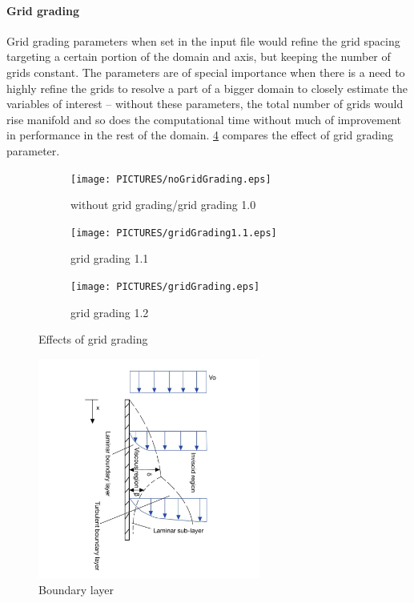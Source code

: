 \paragraph*{Grid grading}\mbox{} Grid grading parameters when set in the input file would refine the grid spacing targeting a certain portion of the domain and axis, but keeping the number of grids constant. The parameters are of special importance when there is a need to highly refine the grids to resolve a part of a bigger domain to closely estimate the variables of interest -- without these parameters, the total number of grids would rise manifold and so does the computational time without much of improvement in performance in the rest of the domain. \cref{fig:gridGrading} compares the effect of grid grading parameter. \\
\begin{figure}[!h]
        \centering
    \begin{subfigure}{.3\linewidth}
        \centering
        \texttt{[image: PICTURES/noGridGrading.eps]}
        \caption{without grid grading/grid grading 1.0}
        \label{fig:nogg}       %
    \end{subfigure}%
        \hfill
    \begin{subfigure}{.3\linewidth}
        \centering
        \texttt{[image: PICTURES/gridGrading1.1.eps]}
        \caption{grid grading 1.1}
        \label{fig:gg1.1}       %
    \end{subfigure}%
    \hfill
    \begin{subfigure}{.3\linewidth}
        \centering
        \texttt{[image: PICTURES/gridGrading.eps]}
        \caption{grid grading 1.2}
        \label{fig:gg1.2}       %
    \end{subfigure}%
        \hfill
     \caption{Effects of grid grading}
     \label{fig:gridGrading}
\end{figure}

\begin{figure}
    \centering
    \includegraphics[width=0.65\textwidth]{PICTURES/BL.jpg}
    \caption{Boundary layer}
    \label{fig:BL}       %
\end{figure}

